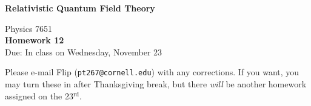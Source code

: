 \documentclass[12pt]{article}
\begin{document}
\vspace*{-1cm}
\begin{center}
{\LARGE \bf Relativistic Quantum Field Theory}

\vspace*{0.5cm}
{\Large Physics 7651} \\
\vspace*{0.5cm}
{\Large {\bf Homework 12}\\
\vspace*{0.5cm}
Due: In class on Wednesday, November 23}
\end{center}

\noindent Please e-mail Flip (\texttt{pt267@cornell.edu}) with any corrections. If you want, you may turn these in after Thanksgiving break, but there \textit{will} be another homework assigned on the 23$^\text{rd}$.
\end{document}
